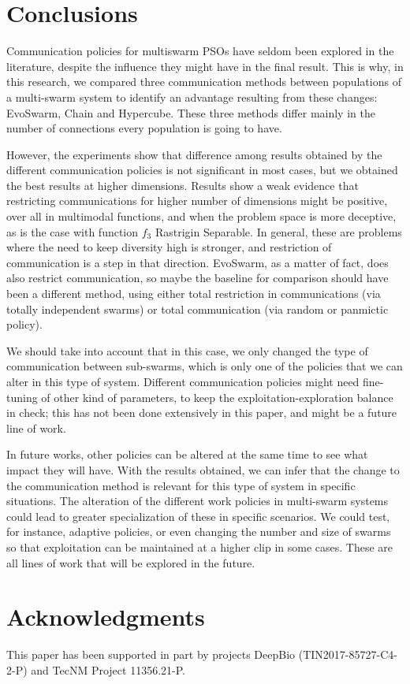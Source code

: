\documentclass[runningheads]{llncs}
\begin{document}
\section{Conclusions}

Communication policies for multiswarm PSOs have seldom been explored
in the literature, despite the influence they might have in the final
result. This is why, in this research, we compared three communication methods between populations of
a multi-swarm system to identify an advantage resulting from these
changes: EvoSwarm, Chain and Hypercube. These three methods differ
mainly in the number of connections every population is going to
have.

However, the experiments show that difference among results obtained
by the different communication policies is not significant in most cases,
but we obtained the best results at higher dimensions. Results show a
weak evidence that restricting communications for higher number of
dimensions might be positive, over all in multimodal functions, and when the problem space is more deceptive, as is the case with function
$f_{3}$ Rastrigin Separable. In general, these are problems where the
need to keep diversity high is stronger, and restriction of
communication is a step in that direction. EvoSwarm, as a matter of
fact, does also restrict communication, so maybe the baseline for
comparison should have been a different method, using either total
restriction in communications (via totally independent swarms) or
total communication (via random or panmictic policy).

We should take
into account that in this case, we only changed the type of communication
between sub-swarms, which is only one of the policies that we can alter in this
type of system. Different communication policies might need
fine-tuning of other kind of parameters, to keep the
exploitation-exploration balance in check; this has not been done
extensively in this paper, and might be a future line of work.

In future works, other policies can be altered at the same time to see
what impact they will have. With the results obtained, we can infer
that the change to the communication method is relevant for this type
of system in specific situations. The alteration of the different work
policies in multi-swarm systems could lead to greater specialization
of these in specific scenarios. We could test, for instance, adaptive
policies, or even changing the number and size of swarms so that
exploitation can be maintained at a higher clip in some cases. These
are all lines of work that will be explored in the future.


\section*{Acknowledgments}

This paper has been supported in part by projects DeepBio (TIN2017-85727-C4-2-P)
and TecNM Project 11356.21-P.

\printbibliography
\end{document}
